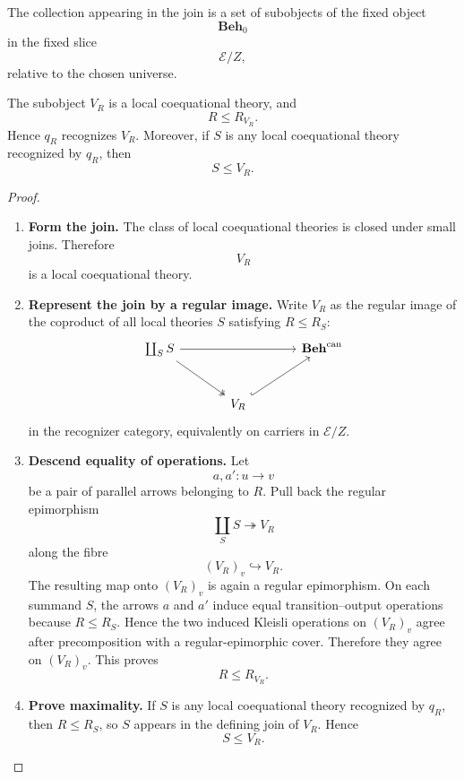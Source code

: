 The collection appearing in the join is a set of subobjects of the fixed object
\[
    \mathbf{Beh}_0
\]
in the fixed slice
\[
    \mathcal E/Z,
\]
relative to the chosen universe.

\begin{proposition}
\label{prop:largest-recognized-theory}
    The subobject \(V_R\) is a local coequational theory, and
    \[
        R\leq R_{V_R}.
    \]
    Hence \(q_R\) recognizes \(V_R\). Moreover, if \(S\) is any local
    coequational theory recognized by \(q_R\), then
    \[
        S\leq V_R.
    \]
\end{proposition}

\begin{proof}
    \leavevmode
    \begin{enumerate}
        \item \textbf{Form the join.}
        The class of local coequational theories is closed under small joins.
        Therefore
        \[
            V_R
        \]
        is a local coequational theory.

        \item \textbf{Represent the join by a regular image.}
        Write \(V_R\) as the regular image of the coproduct of all local
        theories \(S\) satisfying \(R\leq R_S\):
        \[
        \begin{tikzcd}[column sep=large, row sep=large]
            \coprod_S S
                \arrow[rr]
                \arrow[dr, two heads]
            &&
            \mathbf{Beh}^{\mathrm{can}}
            \\
            &
            V_R
                \arrow[ur, hook]
            &
        \end{tikzcd}
        \]
        in the recognizer category, equivalently on carriers in
        \(\mathcal E/Z\).

        \item \textbf{Descend equality of operations.}
        Let
        \[
            a,a':u\to v
        \]
        be a pair of parallel arrows belonging to \(R\). Pull back the regular
        epimorphism
        \[
            \coprod_S S\twoheadrightarrow V_R
        \]
        along the fibre
        \[
            (V_R)_v\hookrightarrow V_R.
        \]
        The resulting map onto \((V_R)_v\) is again a regular epimorphism. On
        each summand \(S\), the arrows \(a\) and \(a'\) induce equal
        transition--output operations because \(R\leq R_S\). Hence the two
        induced Kleisli operations on \((V_R)_v\) agree after precomposition
        with a regular-epimorphic cover. Therefore they agree on \((V_R)_v\).
        This proves
        \[
            R\leq R_{V_R}.
        \]

        \item \textbf{Prove maximality.}
        If \(S\) is any local coequational theory recognized by \(q_R\), then
        \(R\leq R_S\), so \(S\) appears in the defining join of \(V_R\). Hence
        \[
            S\leq V_R.
        \]
    \end{enumerate}
\end{proof}


